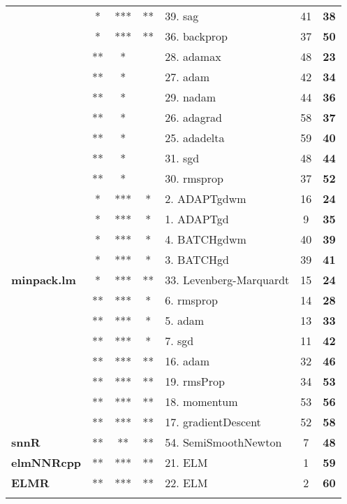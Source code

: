 \begin{Schunk}
\begin{table}
\begin{tabular}[t]{>{\bfseries}lccclc>{\bfseries}c}
 & * & *** & ** & 39. sag & 41 & 38\\

\multirow{-5}{*}{\raggedright\arraybackslash neuralnet} & * & *** & ** & 36. backprop & 37 & 50\\
\cmidrule{1-7}
 & ** & * &  & 28. adamax & 48 & 23\\

 & ** & * &  & 27. adam & 42 & 34\\

 & ** & * &  & 29. nadam & 44 & 36\\

 & ** & * &  & 26. adagrad & 58 & 37\\

 & ** & * &  & 25. adadelta & 59 & 40\\

 & ** & * &  & 31. sgd & 48 & 44\\

\multirow{-7}{*}{\raggedright\arraybackslash keras} & ** & * &  & 30. rmsprop & 37 & 52\\
\cmidrule{1-7}
 & * & *** & * & 2. ADAPTgdwm & 16 & 24\\

 & * & *** & * & 1. ADAPTgd & 9 & 35\\

 & * & *** & * & 4. BATCHgdwm & 40 & 39\\

\multirow{-4}{*}{\raggedright\arraybackslash AMORE} & * & *** & * & 3. BATCHgd & 39 & 41\\
\cmidrule{1-7}
minpack.lm & * & *** & ** & 33. Levenberg-Marquardt & 15 & 24\\
\cmidrule{1-7}
 & ** & *** & * & 6. rmsprop & 14 & 28\\

 & ** & *** & * & 5. adam & 13 & 33\\

\multirow{-3}{*}{\raggedright\arraybackslash ANN2} & ** & *** & * & 7. sgd & 11 & 42\\
\cmidrule{1-7}
 & ** & *** & ** & 16. adam & 32 & 46\\

 & ** & *** & ** & 19. rmsProp & 34 & 53\\

 & ** & *** & ** & 18. momentum & 53 & 56\\

\multirow{-4}{*}{\raggedright\arraybackslash deepdive} & ** & *** & ** & 17. gradientDescent & 52 & 58\\
\cmidrule{1-7}
snnR & ** & ** & ** & 54. SemiSmoothNewton & 7 & 48\\
\cmidrule{1-7}
elmNNRcpp & ** & *** & ** & 21. ELM & 1 & 59\\
\cmidrule{1-7}
ELMR & ** & *** & ** & 22. ELM & 2 & 60\\
\bottomrule
\multicolumn{7}{l}{\textit{Note: } Statistics over 10 runs.}\\
\end{tabular}
\end{table}


\end{Schunk}
